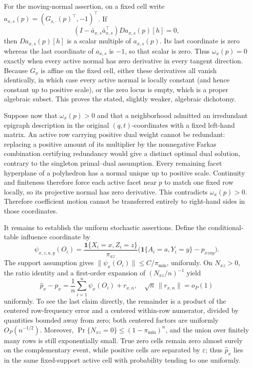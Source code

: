 For the moving-normal assertion, on a fixed cell write \(a_{x,s}(p)=(G_{s,\cdot}(p)^\top,-1)^\top\).  If
\[
 (I-\bar a_{x,s}\bar a_{x,s}^\top)Da_{x,s}(p)[h]=0,
\]
then \(Da_{x,s}(p)[h]\) is a scalar multiple of \(a_{x,s}(p)\).  Its last coordinate is zero whereas the last coordinate of \(a_{x,s}\) is \(-1\), so that scalar is zero.  Thus \(\omega_x(p)=0\) exactly when every active normal has zero derivative in every tangent direction.  Because \(G_x\) is affine on the fixed cell, either these derivatives all vanish identically, in which case every active normal is locally constant (and hence constant up to positive scale), or the zero locus is empty, which is a proper algebraic subset.  This proves the stated, slightly weaker, algebraic dichotomy.

Suppose now that \(\omega_x(p)>0\) and that a neighborhood admitted an irredundant epigraph description in the original \((q,t)\)-coordinates with a fixed left-hand matrix.  An active row carrying positive dual weight cannot be redundant: replacing a positive amount of its multiplier by the nonnegative Farkas combination certifying redundancy would give a distinct optimal dual solution, contrary to the singleton primal--dual assumption.  Every remaining facet hyperplane of a polyhedron has a normal unique up to positive scale.  Continuity and finiteness therefore force each active facet near \(p\) to match one fixed row locally, so its projective normal has zero derivative.  This contradicts \(\omega_x(p)>0\).  Therefore coefficient motion cannot be transferred entirely to right-hand sides in those coordinates.

It remains to establish the uniform stochastic assertions.  Define the conditional-table influence coordinate by
\[
 \psi_{x,z,a,y}(O_i)=\frac{\mathbf1\{X_i=x,Z_i=z\}}{\pi_{xz}}
 \bigl(\mathbf1\{A_i=a,Y_i=y\}-p_{xzay}\bigr).
\]
The support assumption gives \(\|\psi_x(O_i)\|\leq C/\pi_{\min}\), uniformly.  On \(N_{xz}>0\), the ratio identity and a first-order expansion of \((N_{xz}/n)^{-1}\) yield
\[
 \widehat p_x-p_x=\frac1n\sum_{i=1}^n\psi_x(O_i)+r_{x,n},
 \quad \sqrt n\,\|r_{x,n}\|=o_P(1)
\]
uniformly.  To see the last claim directly, the remainder is a product of the centered row-frequency error and a centered within-row numerator, divided by quantities bounded away from zero; both centered factors are uniformly \(O_P(n^{-1/2})\).  Moreover, \(\Pr\{N_{xz}=0\}\leq(1-\pi_{\min})^n\), and the union over finitely many rows is still exponentially small.  True zero cells remain zero almost surely on the complementary event, while positive cells are separated by \(\varepsilon\); thus \(\widehat p_x\) lies in the same fixed-support active cell with probability tending to one uniformly.

